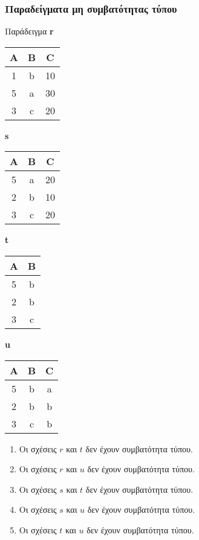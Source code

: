 \begin{frame}
\frametitle{Παραδείγματα μη συμβατότητας τύπου}
\begin{minipage}{\wE}
  \begin{exampleblock}{Παράδειγμα}
      \en
      \textbf{r} \vspace{0.5cm}
      \begin{tabular}{ c c c } \toprule
        {\bf A} & {\bf B} & {\bf C} \\ \midrule
        1 & b & 10 \\
        5 & a & 30 \\
        3 & c & 20 \\   \hline
      \end{tabular} \phantom{}
      \textbf{s}  \vspace{0.5cm}
      \begin{tabular}{ c c c } \toprule
        {\bf A} & {\bf B} & {\bf C} \\ \midrule
        5 & a & 20 \\
        2 & b & 10 \\
        3 & c & 20 \\   \hline
      \end{tabular} \phantom{}
      \textbf{t}
      \begin{tabular}{ c c } \toprule
        {\bf A} & {\bf B}  \\ \midrule
        5 & b \\
        2 & b \\
        3 & c \\    \hline
      \end{tabular} \phantom{}
      \textbf{u}
      \begin{tabular}{ c c c } \toprule
        {\bf A} & {\bf B} & {\bf C} \\ \midrule
        5 & b & a \\
        2 & b & b \\
        3 & c & b \\    \hline
      \end{tabular}
    \el

  \end{exampleblock}
    \begin{enumerate}
      \item Οι σχέσεις $r$ και $t$ δεν έχουν συμβατότητα τύπου.
      \item Οι σχέσεις $r$ και $u$ δεν έχουν συμβατότητα τύπου.
      \item Οι σχέσεις $s$ και $t$ δεν έχουν συμβατότητα τύπου.
      \item Οι σχέσεις $s$ και $u$ δεν έχουν συμβατότητα τύπου.
      \item Οι σχέσεις $t$ και $u$ δεν έχουν συμβατότητα τύπου.
    \end{enumerate}
\end{minipage}
\end{frame}